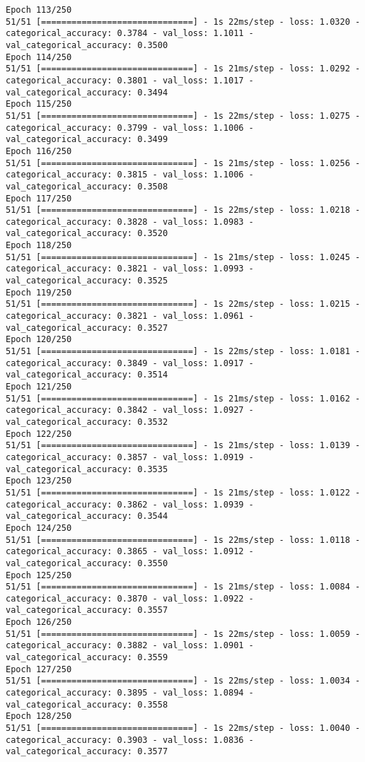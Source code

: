 \begin{lstlisting}
Epoch 113/250
51/51 [==============================] - 1s 22ms/step - loss: 1.0320 - categorical_accuracy: 0.3784 - val_loss: 1.1011 - val_categorical_accuracy: 0.3500
Epoch 114/250
51/51 [==============================] - 1s 21ms/step - loss: 1.0292 - categorical_accuracy: 0.3801 - val_loss: 1.1017 - val_categorical_accuracy: 0.3494
Epoch 115/250
51/51 [==============================] - 1s 22ms/step - loss: 1.0275 - categorical_accuracy: 0.3799 - val_loss: 1.1006 - val_categorical_accuracy: 0.3499
Epoch 116/250
51/51 [==============================] - 1s 21ms/step - loss: 1.0256 - categorical_accuracy: 0.3815 - val_loss: 1.1006 - val_categorical_accuracy: 0.3508
Epoch 117/250
51/51 [==============================] - 1s 22ms/step - loss: 1.0218 - categorical_accuracy: 0.3828 - val_loss: 1.0983 - val_categorical_accuracy: 0.3520
Epoch 118/250
51/51 [==============================] - 1s 21ms/step - loss: 1.0245 - categorical_accuracy: 0.3821 - val_loss: 1.0993 - val_categorical_accuracy: 0.3525
Epoch 119/250
51/51 [==============================] - 1s 22ms/step - loss: 1.0215 - categorical_accuracy: 0.3821 - val_loss: 1.0961 - val_categorical_accuracy: 0.3527
Epoch 120/250
51/51 [==============================] - 1s 22ms/step - loss: 1.0181 - categorical_accuracy: 0.3849 - val_loss: 1.0917 - val_categorical_accuracy: 0.3514
Epoch 121/250
51/51 [==============================] - 1s 21ms/step - loss: 1.0162 - categorical_accuracy: 0.3842 - val_loss: 1.0927 - val_categorical_accuracy: 0.3532
Epoch 122/250
51/51 [==============================] - 1s 21ms/step - loss: 1.0139 - categorical_accuracy: 0.3857 - val_loss: 1.0919 - val_categorical_accuracy: 0.3535
Epoch 123/250
51/51 [==============================] - 1s 21ms/step - loss: 1.0122 - categorical_accuracy: 0.3862 - val_loss: 1.0939 - val_categorical_accuracy: 0.3544
Epoch 124/250
51/51 [==============================] - 1s 22ms/step - loss: 1.0118 - categorical_accuracy: 0.3865 - val_loss: 1.0912 - val_categorical_accuracy: 0.3550
Epoch 125/250
51/51 [==============================] - 1s 21ms/step - loss: 1.0084 - categorical_accuracy: 0.3870 - val_loss: 1.0922 - val_categorical_accuracy: 0.3557
Epoch 126/250
51/51 [==============================] - 1s 22ms/step - loss: 1.0059 - categorical_accuracy: 0.3882 - val_loss: 1.0901 - val_categorical_accuracy: 0.3559
Epoch 127/250
51/51 [==============================] - 1s 22ms/step - loss: 1.0034 - categorical_accuracy: 0.3895 - val_loss: 1.0894 - val_categorical_accuracy: 0.3558
Epoch 128/250
51/51 [==============================] - 1s 22ms/step - loss: 1.0040 - categorical_accuracy: 0.3903 - val_loss: 1.0836 - val_categorical_accuracy: 0.3577

\end{lstlisting}
